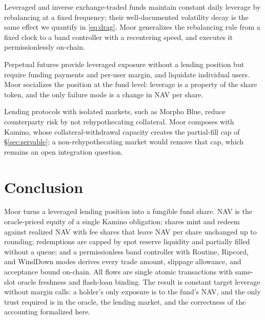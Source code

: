 \documentclass[11pt]{article}
\theoremstyle{remark}
\begin{document}
Leveraged and inverse exchange-traded funds maintain constant daily leverage by rebalancing at a fixed frequency; their well-documented volatility decay \cite{cheng2009} is the same effect we quantify in \eqref{eq:drag}. Moor generalizes the rebalancing rule from a fixed clock to a band controller with a recentering speed, and executes it permissionlessly on-chain.

Perpetual futures provide leveraged exposure without a lending position but require funding payments and per-user margin, and liquidate individual users. Moor socializes the position at the fund level: leverage is a property of the share token, and the only failure mode is a change in NAV per share.

Lending protocols with isolated markets, such as Morpho Blue, reduce counterparty risk by not rehypothecating collateral. Moor composes with Kamino, whose collateral-withdrawal capacity creates the partial-fill cap of \S\ref{sec:servable}; a non-rehypothecating market would remove that cap, which remains an open integration question.

\section{Conclusion}

Moor turns a leveraged lending position into a fungible fund share. NAV is the oracle-priced equity of a single Kamino obligation; shares mint and redeem against realized NAV with fee shares that leave NAV per share unchanged up to rounding; redemptions are capped by spot reserve liquidity and partially filled without a queue; and a permissionless band controller with Routine, Ripcord, and WindDown modes derives every trade amount, slippage allowance, and acceptance bound on-chain. All flows are single atomic transactions with same-slot oracle freshness and flash-loan binding. The result is constant target leverage without margin calls: a holder's only exposure is to the fund's NAV, and the only trust required is in the oracle, the lending market, and the correctness of the accounting formalized here.
\end{document}
